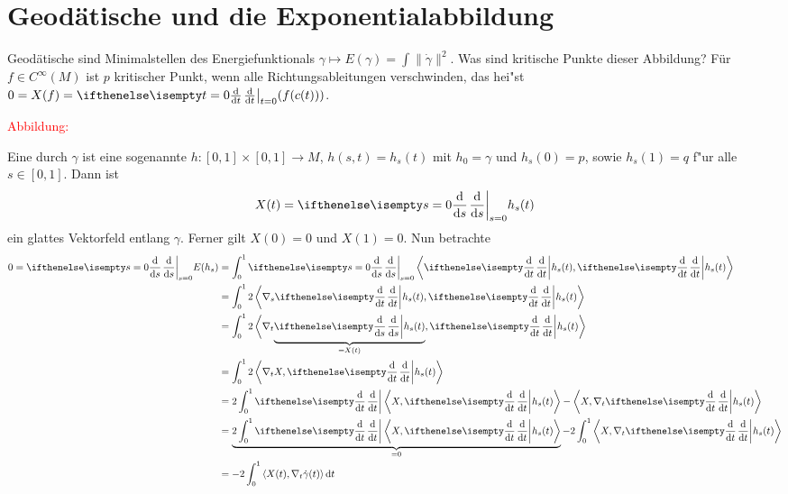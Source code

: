 
\chapter{Geod\"atische und die Exponentialabbildung}

\begin{emptythm}[Heuristik:] Geodätische sind Minimalstellen des Energiefunktionals $\gamma \mapsto E(\gamma) = \int \|\dot\gamma\|^2$. 
Was sind kritische Punkte dieser Abbildung? Für $f \in C^{\infty}(M)$ ist $p$ kritischer Punkt, wenn alle Richtungsableitungen verschwinden, das hei"st $0 = X(f) = \difffrac[t=0]{}{t}(f(c(t)))$.
\end{emptythm}

\begin{center}
  \textcolor{red}{Abbildung: }
\end{center}

Eine  durch $\gamma$ ist eine sogenannte  $h\colon[0,1]\times[0,1] \to M$, $h(s,t) = h_s(t)$ mit $h_0 = \gamma$ und $h_s(0) = p$, sowie $h_s(1) = q$ f"ur alle $s \in [0,1]$. Dann ist
\begin{align*}
  X(t) = \difffrac[s=0]{}{s}h_s(t)
\end{align*}
ein glattes Vektorfeld entlang $\gamma$.
Ferner gilt $X(0) = 0$ und $X(1) = 0$.
Nun betrachte
\begin{align*}
	0  = \difffrac[s=0]{}{s}E(h_s) &= \int_{0}^{1} \difffrac[s=0]{}{s} \left<\difffrac{}{t} h_s(t),\difffrac{}{t}h_s(t)\right>\\
	& = \int_0^1 2 \left<\nabla_s \difffrac{}{t}h_s(t), \difffrac{}{t}h_s(t)\right>\\
	& = \int_0^1 2 \left<\nabla_t\smash{\underbrace{\difffrac{}{s}h_s(t)}_{=X(t)}}, \difffrac{}{t}h_s(t)\right> \vphantom{\underbrace{\difffrac{}{s}h_s(t)}_{=X(t)}}\\
	& = \int_0^1 2 \left<\nabla_tX,\difffrac{}{t}h_s(t)\right>\\
	& = 2 \int_0^1 \difffrac{}{t}\left<X,\difffrac{}{t}h_s(t)\right> - \left<X,\nabla_t\difffrac{}{t}h_s(t)\right>\\
	& = \underbrace{2 \int_0^1 \difffrac{}{t}\left<X,\difffrac{}{t}h_s(t)\right>}_{=0} - 2 \int_0^1 \left<X,\nabla_t\difffrac{}{t}h_s(t)\right>\\
	& = -2 \int_0^1 \left<X(t),\nabla_t\dot\gamma(t)\right>\dop t
\end{align*}

